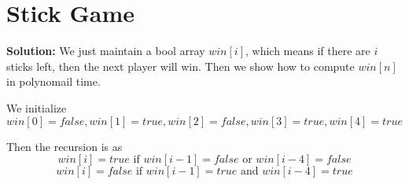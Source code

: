 
\section{Stick Game}
{\bf Solution:} We just maintain a bool array $win[i]$, which means if there are $i$ sticks left, then the next player will win. Then we show how to compute $win[n]$ in polynomail time.

We initialize 
\[
win[0]=false, win[1]=true, win[2]=false, win[3]=true, win[4]=true
\]

Then the recursion is as 
\[
win[i] = true \text{ if } win[i-1] = false \text{ or } win[i-4]=false
\]
\[
win[i] = false \text{ if } win[i-1] = true \text{ and } win[i-4] = true
\]